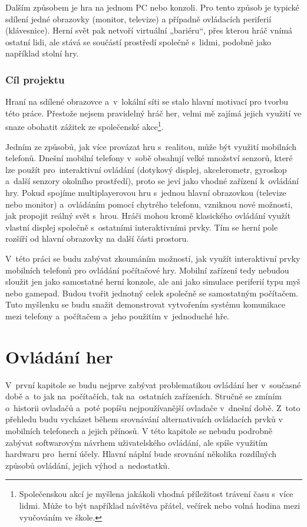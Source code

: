 \documentclass[thesis=B,czech,hidelinks]{FITthesis}[2012/06/26] %
\begin{document}
\begin{introduction}
Dalším způsobem je hra na jednom PC nebo konzoli. Pro tento způsob je typické sdílení jedné obrazovky (monitor, televize) a případně ovládacích periferií (klávesnice). Herní svět pak netvoří virtuální „bariéru“, přes kterou hráč vnímá ostatní lidi, ale stává se součástí prostředí společně s~lidmi, podobně jako například stolní hry.

\subsection{Cíl projektu}

Hraní na sdílené obrazovce a~v~lokální síti se stalo hlavní motivací pro tvorbu této práce. Přestože nejsem pravidelný hráč her, velmi mě zajímá jejich využití ve snaze obohatit zážitek ze společenské akce\footnote{Společenskou akcí je myšlena jakákoli vhodná příležitost trávení času s~více lidmi. Může to být například návštěva přátel, večírek nebo volná hodina mezi vyučováním ve škole.}. 

Jedním ze způsobů, jak více provázat hru s~realitou, může být využití mobilních telefonů. Dnešní mobilní telefony v~sobě obsahují velké množství senzorů, které lze použít pro~interaktivní ovládání (dotykový displej, akcelerometr, gyroskop a~další senzory okolního prostředí), proto se jeví jako vhodné zařízení k~ovládání hry. Pokud spojíme multiplayerovou hru s~jednou hlavní obrazovkou (televize nebo monitor) a~ovládáním pomocí chytrého telefonu, vzniknou nové možnosti, jak propojit reálný svět s~hrou. Hráči mohou kromě klasického ovládání využít vlastní displej společně s~ostatními interaktivními prvky. Tím se herní pole rozšíří od hlavní obrazovky na další části prostoru.

V~této práci se budu zabývat zkoumáním možností, jak využít interaktivní prvky mobilních telefonů pro ovládání počítačové hry. Mobilní zařízení tedy nebudou sloužit jen jako samostatné herní konzole, ale ani jako simulace periferií typu myš nebo gamepad. Budou tvořit jednotný celek společně se samostatným počítačem. Tuto myšlenku se budu snažit demonstrovat vytvořením systému komunikace mezi telefony a~počítačem a~jeho použitím v~jednoduché hře.

\end{introduction}

\chapter{Ovládání her}

V~první kapitole se budu nejprve zabývat problematikou ovládání her v~současné době a~to jak na~počítačích, tak na~ostatních zařízeních. Stručně se zmíním o~historii ovladačů a~poté popíšu nejpoužívanější ovladače v~dnešní době. Z~toto přehledu budu vycházet během srovnávání alternativních ovládacích prvků v mobilních telefonech a jejich přínosů. V této kapitole se nebudu podrobně zabývat softwarovým návrhem uživatelského ovládání, ale spíše využitím hardwaru pro~herní účely. Hlavní náplní bude srovnání několika rozdílných způsobů ovládání, jejich výhod a~nedostatků.
\end{document}
